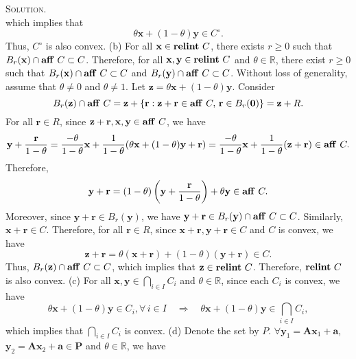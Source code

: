 \documentclass[12pt, a4paper, oneside]{ctexart}
\newenvironment{solution}{\par\noindent\textsc{Solution. }}{\\\par}
\DeclareMathOperator*{\relint}{\bf relint\,}
\DeclareMathOperator*{\aff}{\bf aff\,}
\begin{document}
\begin{solution}
\[	\]
	which implies that 
	\[
	\theta \mathbf{x} + (1 - \theta) \mathbf{y} \in C^\circ.
	\]
	Thus, $C^\circ$ is also convex.
	\newline\newline
	(b) For all $\mathbf{x} \in \relint C$, there exists $r \geq 0$ such that $B_r(\mathbf{x}) \cap \aff C \subset C$. Therefore, for all $\mathbf{x}, \mathbf{y} \in \relint C$ and $\theta \in \mathbb{R}$, there exist $r \geq 0$ such that $B_r(\mathbf{x}) \cap \aff C \subset C$ and $B_r(\mathbf{y}) \cap \aff C \subset C$. 
	\newline
	Without loss of generality, assume that $\theta \neq 0$ and $\theta \neq 1$. Let $\mathbf{z} = \theta \mathbf{x} + (1 - \theta) \mathbf{y}$. Consider 
	\[
	B_r(\mathbf{z}) \cap \aff C = \mathbf{z} + \{\mathbf{r} : \mathbf{z} + \mathbf{r} \in \aff C, \, \mathbf{r} \in B_r(\mathbf{0})\} = \mathbf{z} + R.
	\]
	For all $\mathbf{r} \in R$, since $\mathbf{z} + \mathbf{r}, \mathbf{x}, \mathbf{y} \in \aff C$, we have
	\[
	\mathbf{y} + \frac{\mathbf{r}}{1 - \theta} = \frac{-\theta}{1 - \theta} \mathbf{x} + \frac{1}{1 - \theta} (\theta \mathbf{x} + (1 - \theta) \mathbf{y} + \mathbf{r}) = \frac{-\theta}{1 - \theta} \mathbf{x} + \frac{1}{1 - \theta} (\mathbf{z} + \mathbf{r}) \in \aff C.
	\]
	Therefore, 
	\[
	\mathbf{y} + \mathbf{r} = (1 - \theta) \left(\mathbf{y} + \frac{\mathbf{r}}{1 - \theta}\right) + \theta \mathbf{y} \in \aff C.
	\]
	Moreover, since $\mathbf{y} + \mathbf{r} \in B_r(\mathbf{y})$, we have $\mathbf{y} + \mathbf{r} \in B_r(\mathbf{y}) \cap \aff C \subset C$. Similarly, $\mathbf{x} + \mathbf{r} \in C$. 
	Therefore, for all $\mathbf{r} \in R$, since $\mathbf{x} + \mathbf{r}, \mathbf{y} + \mathbf{r} \in C$ and $C$ is convex, we have 
	\[
	\mathbf{z} + \mathbf{r} = \theta (\mathbf{x} + \mathbf{r}) + (1 - \theta)(\mathbf{y} + \mathbf{r}) \in C.
	\]
	Thus, $B_r(\mathbf{z}) \cap \aff C \subset C$, which implies that $\mathbf{z} \in \relint C$. 
	Therefore, $\relint C$ is also convex.
	\newline\newline
	(c) For all $\mathbf{x}, \mathbf{y} \in \bigcap_{i \in I} C_i$ and $\theta \in \mathbb{R}$, since each $C_i$ is convex, we have
	\[
	\theta \mathbf{x} + (1 - \theta) \mathbf{y} \in C_i, \forall\, i \in I \quad \Rightarrow \quad \theta \mathbf{x} + (1 - \theta) \mathbf{y} \in \bigcap_{i \in I} C_i,
	\]
	which implies that $\bigcap_{i \in I} C_i$ is convex.
	\newline\newline
	(d) Denote the set by $P$. $\forall \mathbf{y}_1 = \mathbf{Ax}_1 + \mathbf{a}$, $\mathbf{y}_2 = \mathbf{Ax}_2 + \mathbf{a} \in \mathbf{P}$ and $\theta \in \mathbb{R}$, we have

\end{solution}
\end{document}
